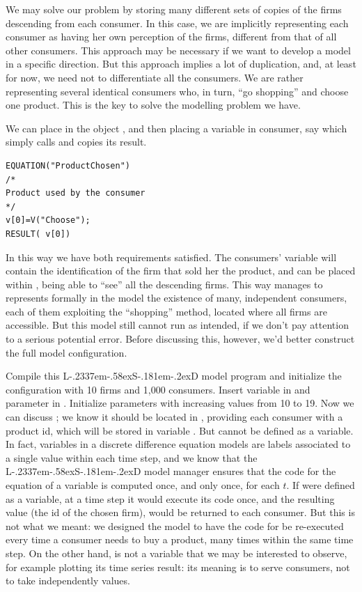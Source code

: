 \documentclass [11pt,a4paper] {book}
\def\LsD{{L\kern-.2337em\lower-.58ex\hbox{S}\kern-.181em\lower-.2ex\hbox{D}}\xspace}
\begin{document}
We may solve our problem by storing many different sets of copies of the firms descending from each consumer. In this case, we are implicitly representing each consumer as having her own perception of the firms, different from that of all other consumers. This approach may be necessary if we want to develop a model in a specific direction. But this approach implies a lot of duplication, and, at least for now, we need not to differentiate all the consumers. We are rather representing several identical consumers who, in turn, ``go shopping'' and choose one product. This is the key to solve the modelling problem we have.

We can place  in the object , and then placing a variable in consumer, say  which simply calls  and copies its result.


\begin{minipage}[h]{10cm}
\small
\begin{verbatim}
EQUATION("ProductChosen")
/*
Product used by the consumer
*/
v[0]=V("Choose");
RESULT( v[0])

\end{verbatim}
\normalsize
\end{minipage}

In this way we have both requirements satisfied. The consumers' variable  will contain the identification of the firm that sold her the product, and  can be placed within , being able to ``see'' all the descending firms. This way manages to represents formally in the model the existence of many, independent consumers, each of them exploiting the ``shopping'' method, located where all firms are accessible. But this model still cannot run as intended, if we don't pay attention to a serious potential error. Before discussing this, however, we'd better construct the full model configuration.

Compile this \LsD model program and initialize the configuration with 10 firms and 1,000 consumers. Insert variable  in  and parameter  in . Initialize parameters  with increasing values from 10 to 19. Now we can discuss ; we know it should be located in , providing each consumer with a product id, which will be stored in variable . But   cannot be defined as a variable. In fact, variables in a discrete difference equation models are labels associated to a single value within each time step, and we know that the \LsD model manager ensures that the code for the equation of a variable is computed once, and only once, for each $t$. If  were defined as a variable, at a time step it would execute its code once, and the resulting value (the id of the chosen firm), would be returned to each consumer. But this is not what we meant: we designed the model to have the code for  be re-executed every time a consumer needs to buy a product, many times within the same time step. On the other hand,  is not a variable that we may be interested to observe, for example plotting its time series result: its meaning is to serve consumers, not to take independently values.
\end{document}
